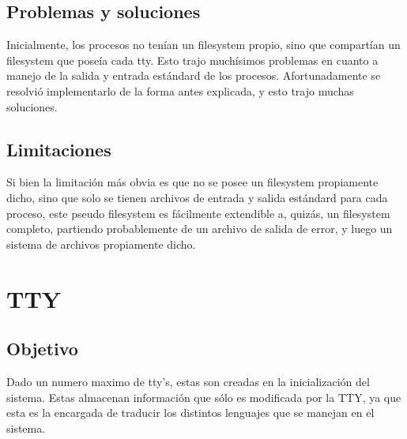 \documentclass[10pt,a4paper]{article}
\begin{document}
	\subsection{Problemas y soluciones}
		Inicialmente, los procesos no ten\'ian un filesystem propio, sino que compart\'ian un filesystem que pose\'ia cada tty. Esto trajo much\'isimos problemas en cuanto a manejo de la salida y entrada est\'andard de los procesos. Afortunadamente se resolvi\'o implementarlo de la forma antes explicada, y esto trajo muchas soluciones.
	\subsection{Limitaciones}
		Si bien la limitaci\'on m\'as obvia es que no se posee un filesystem propiamente dicho, sino que solo se tienen archivos de entrada y salida est\'andard para cada proceso, este pseudo filesystem es f\'acilmente extendible a, quiz\'as, un filesystem completo, partiendo probablemente de un archivo de salida de error, y luego un sistema de archivos propiamente dicho.
\newpage
\section{TTY}
	\subsection{Objetivo}
		Dado un numero maximo de tty's, estas son creadas en la inicializaci\'on del  sistema. Estas almacenan informaci\'on que s\'olo es modificada por la TTY, ya que esta es la encargada de traducir los distintos lenguajes que se manejan en el sistema. 
\end{document}
